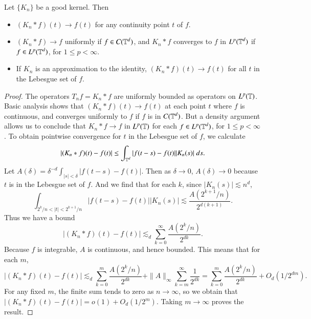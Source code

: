 \begin{theorem}
    Let $\{ K_n \}$ be a good kernel. Then
    \begin{itemize}
        \item $(K_n * f)(t) \to f(t)$ for any continuity point $t$ of $f$.
        \item $(K_n * f) \to f$ uniformly if $f \in C(\operatorname{\mathbb{T}}^d)$, and $K_n * f$ converges to $f$ in $L^p(\operatorname{\mathbb{T}}^d)$ if $f \in L^p(\operatorname{\mathbb{T}}^d)$, for $1 \leq p < \infty$.
        \item If $K_n$ is an approximation to the identity, $(K_n * f)(t) \to f(t)$ for all $t$ in the Lebesgue set of $f$.
    \end{itemize}
\end{theorem}
\begin{proof}
    The operators $T_nf = K_n * f$ are uniformly bounded as operators on $L^p(\operatorname{\mathbb{T}})$. Basic analysis shows that $(K_n * f)(t) \to f(t)$ at each point $t$ where $f$ is continuous, and converges uniformly to $f$ if $f$ is in $C(\operatorname{\mathbb{T}}^d)$. But a density argument allows us to conclude that $K_n * f \to f$ in $L^p(\operatorname{\mathbb{T}})$ for each $f \in L^p(\operatorname{\mathbb{T}}^d)$, for $1 \leq p < \infty$. To obtain pointwise convergence for $t$ in the Lebesgue set of $f$, we calculate
    \[ |(K_n * f)(t) - f(t)| \leq \int_{\operatorname{\mathbb{T}}^d} |f(t - s) - f(t)| |K_n(s)|\; ds. \]
    Let $A(\delta) = \delta^{-d} \int_{|s| < \delta} |f(t-s) - f(t)|$. Then as $\delta \to 0$, $A(\delta) \to 0$ because $t$ is in the Lebesgue set of $f$. And we find that for each $k$, since $|K_n(s)| \lesssim n^d$,
    \[ \int_{2^k/n < |t| < 2^{k+1}/n} |f(t-s) - f(t)| |K_n(s)| \lesssim \frac{A(2^{k+1}/n)}{2^{d(k+1)}}. \]
    Thus we have a bound
    \[ |(K_n * f)(t) - f(t)| \lesssim_d \sum_{k = 0}^\infty \frac{A(2^k/n)}{2^{dk}}. \]
    Because $f$ is integrable, $A$ is continuous, and hence bounded. This means that for each $m$,
    \[ |(K_n * f)(t) - f(t)| \lesssim_d \sum_{k = 0}^m \frac{A(2^k/n)}{2^{dk}} + \| A \|_\infty \sum_{k = m}^\infty \frac{1}{2^{dk}} = \sum_{k = 0}^m \frac{A(2^k/n)}{2^{dk}} + O_d\left( 1/2^{dm} \right). \]
    For any fixed $m$, the finite sum tends to zero as $n \to \infty$, so we obtain that $|(K_n * f)(t) - f(t)| = o(1) + O_d(1/2^m)$. Taking $m \to \infty$ proves the result.
\end{proof}

